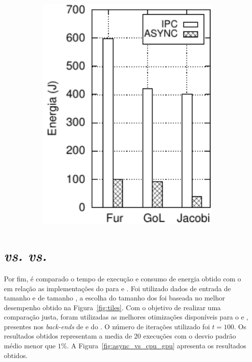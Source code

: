 \begin{figure}
\begin{subfigure}{0.4\textwidth}
    \includegraphics[width=1\textwidth]{figs/ComparisonEnergyTiles1.pdf}
    \label{fig:compara-energia}
  \end{subfigure}
  \label{fig:async_vs_ipc}
\end{figure}

\section{\mppa \async \textit{vs.} \cpu \textit{vs.} \gpu}
\label{sec:async_vs_cpu_gpu}

Por fim, é comparado o tempo de execução e consumo de energia obtido com o \pskelmppa \async em relação as implementações do \pskel para \cpu e \gpu. Foi utilizado dados de entrada de tamanho \ind e \tiles de tamanho \tiled, a escolha do tamanho dos \tiles foi baseada no melhor desempenho obtido na Figura~\ref{fig:tiles}. Com o objetivo de realizar uma comparação justa, foram utilizadas as melhores otimizações disponíveis para o \xeon e \tesla, presentes nos \textit{back-ends} de \multicore e \gpu do \pskel. O número de iterações utilizado foi $t = 100$. Os resultados obtidos representam a media de 20 execuções com o desvio padrão médio menor que $1\%$. A Figura~\ref{fig:async_vs_cpu_gpu} apresenta os resultados obtidos.

